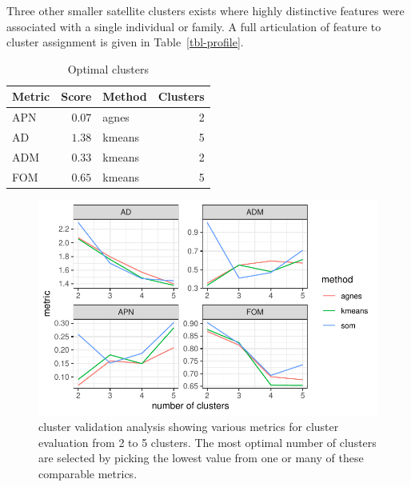\documentclass[
  authoryear,
  preprint,
  3p]{elsarticle}
\begin{document}
Three other smaller satellite clusters exists where highly distinctive
features were associated with a single individual or family. A full
articulation of feature to cluster assignment is given in
Table~\ref{tbl-profile}.

\hypertarget{tbl-opticlust}{}
\begin{longtable}{lrlr}
\caption{\label{tbl-opticlust}Optimal clusters }\tabularnewline

\toprule
Metric & Score & Method & Clusters \\ 
\midrule
APN & $0.07$ & agnes & 2 \\ 
AD & $1.38$ & kmeans & 5 \\ 
ADM & $0.33$ & kmeans & 2 \\ 
FOM & $0.65$ & kmeans & 5 \\ 
\bottomrule
\end{longtable}

\begin{figure}

{\centering \includegraphics{paper_files/figure-pdf/fig-clvalid-1.pdf}

}

\caption{\label{fig-clvalid}cluster validation analysis showing various
metrics for cluster evaluation from 2 to 5 clusters. The most optimal
number of clusters are selected by picking the lowest value from one or
many of these comparable metrics.}

\end{figure}
\end{document}

